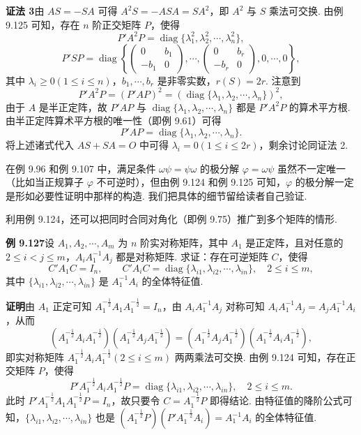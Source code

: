\documentclass[UTF8, 12pt, fontset=fandol, oneside]{ctexart}
\begin{document}
\noindent\textbf{证法 3}\quad 由 $AS=-SA$ 可得 $A^2S=-ASA=SA^2$，即 $A^2$ 与 $S$ 乘法可交换. 由例 9.125 可知，存在 $n$ 阶正交矩阵 $P$，使得
\[
P'A^2P=\operatorname{diag}\{\lambda_1^2,\lambda_2^2,\cdots,\lambda_n^2\},
\]
\[
P'SP=\operatorname{diag}\left\{
\begin{pmatrix}
0&b_1\\
-b_1&0
\end{pmatrix},\cdots,
\begin{pmatrix}
0&b_r\\
-b_r&0
\end{pmatrix},
0,\cdots,0
\right\},
\]
其中 $\lambda_i\ge0(1\le i\le n)$，$b_1,\cdots,b_r$ 是非零实数，$r(S)=2r$. 注意到
\[
P'A^2P=(P'AP)^2=(\operatorname{diag}\{\lambda_1,\lambda_2,\cdots,\lambda_n\})^2,
\]
由于 $A$ 是半正定阵，故 $P'AP$ 与 $\operatorname{diag}\{\lambda_1,\lambda_2,\cdots,\lambda_n\}$ 都是 $P'A^2P$ 的算术平方根. 由半正定阵算术平方根的唯一性（即例 9.61）可得
\[
P'AP=\operatorname{diag}\{\lambda_1,\lambda_2,\cdots,\lambda_n\}.
\]
将上述诸式代入 $AS+SA=O$ 中可得 $\lambda_i=0(1\le i\le2r)$，剩余讨论同证法 2.

在例 9.96 和例 9.107 中，满足条件 $\omega\psi=\psi\omega$ 的极分解 $\varphi=\omega\psi$ 虽然不一定唯一（比如当正规算子 $\varphi$ 不可逆时），但由例 9.124 和例 9.125 可知，$\varphi$ 的极分解一定是形如必要性证明中那样的构造. 我们把具体的细节留给读者自己验证.

利用例 9.124，还可以把同时合同对角化（即例 9.75）推广到多个矩阵的情形.

\noindent\textbf{例 9.127}\quad 设 $A_1,A_2,\cdots,A_m$ 为 $n$ 阶实对称矩阵，其中 $A_1$ 是正定阵，且对任意的 $2\le i<j\le m$，$A_iA_1^{-1}A_j$ 都是对称矩阵. 求证：存在可逆矩阵 $C$，使得
\[
C'A_1C=I_n,\qquad C'A_iC=\operatorname{diag}\{\lambda_{i1},\lambda_{i2},\cdots,\lambda_{in}\},\quad 2\le i\le m,
\]
其中 $\{\lambda_{i1},\lambda_{i2},\cdots,\lambda_{in}\}$ 是 $A_1^{-1}A_i$ 的全体特征值.

\noindent\textbf{证明}\quad 由 $A_1$ 正定可知 $A_1^{-\frac12}A_1A_1^{-\frac12}=I_n$，由 $A_iA_1^{-1}A_j$ 对称可知 $A_iA_1^{-1}A_j=A_jA_1^{-1}A_i$，从而
\[
(A_1^{-\frac12}A_iA_1^{-\frac12})(A_1^{-\frac12}A_jA_1^{-\frac12})
=(A_1^{-\frac12}A_jA_1^{-\frac12})(A_1^{-\frac12}A_iA_1^{-\frac12}),
\]
即实对称矩阵 $A_1^{-\frac12}A_iA_1^{-\frac12}(2\le i\le m)$ 两两乘法可交换. 由例 9.124 可知，存在正交矩阵 $P$，使得
\[
P'A_1^{-\frac12}A_iA_1^{-\frac12}P=\operatorname{diag}\{\lambda_{i1},\lambda_{i2},\cdots,\lambda_{in}\},\quad 2\le i\le m.
\]
此时 $P'A_1^{-\frac12}A_1A_1^{-\frac12}P=I_n$，故只要令 $C=A_1^{-\frac12}P$ 即得结论. 由特征值的降阶公式可知，$\{\lambda_{i1},\lambda_{i2},\cdots,\lambda_{in}\}$ 也是 $(A_1^{-\frac12}P)(P'A_1^{-\frac12}A_i)=A_1^{-1}A_i$ 的全体特征值.
\end{document}
